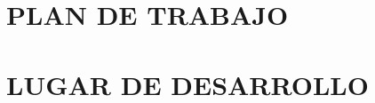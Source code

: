\documentclass[12pt]{report}
\begin{document}
	\chapter{PLAN DE TRABAJO}
	
	
	
	
	\chapter{LUGAR DE DESARROLLO}
	
	
	
	\pagebreak
	\printbibliography
	\thispagestyle{empty}
	
\end{document}
